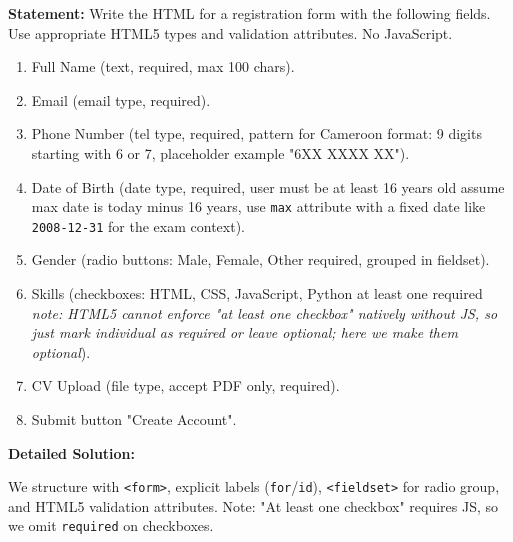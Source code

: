 \documentclass[11pt]{article}
\begin{document}
\begin{exoresolu}
\textbf{Statement:} Write the HTML for a registration form with the following fields. Use appropriate HTML5 types and validation attributes. No JavaScript.
\begin{enumerate}
    \item Full Name (text, required, max 100 chars).
    \item Email (email type, required).
    \item Phone Number (tel type, required, pattern for Cameroon format: 9 digits starting with 6 or 7, placeholder example "6XX XXXX XX").
    \item Date of Birth (date type, required, user must be at least 16 years old \textemdash assume max date is today minus 16 years, use \texttt{max} attribute with a fixed date like \texttt{2008-12-31} for the exam context).
    \item Gender (radio buttons: Male, Female, Other \textemdash required, grouped in fieldset).
    \item Skills (checkboxes: HTML, CSS, JavaScript, Python \textemdash at least one required \emph{note: HTML5 cannot enforce "at least one checkbox" natively without JS, so just mark individual as required or leave optional; here we make them optional}).
    \item CV Upload (file type, accept PDF only, required).
    \item Submit button "Create Account".
\end{enumerate}
\tcblower
\textbf{Detailed Solution:}

We structure with \texttt{<form>}, explicit labels (\texttt{for}/\texttt{id}), \texttt{<fieldset>} for radio group, and HTML5 validation attributes. Note: "At least one checkbox" requires JS, so we omit \texttt{required} on checkboxes.


\end{exoresolu}
\end{document}
